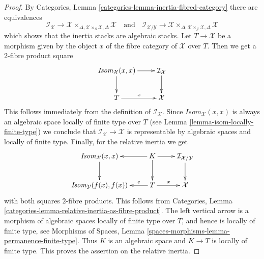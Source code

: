 \documentclass[10pt,a4paper]{amsart}
\theoremstyle{plain}
\theoremstyle{definition}
\theoremstyle{remark}
\numberwithin{equation}{subsection}
\begin{document}
\begin{proof}
By
Categories, Lemma \ref{categories-lemma-inertia-fibred-category}
there are equivalences
$$
\mathcal{I}_\mathcal{X} \to
\mathcal{X} \times_{\Delta, \mathcal{X} \times_S \mathcal{X}, \Delta}
\mathcal{X}
\quad\text{and}\quad
\mathcal{I}_{\mathcal{X}/\mathcal{Y}} \to
\mathcal{X}
\times_{\Delta, \mathcal{X} \times_\mathcal{Y} \mathcal{X}, \Delta}
\mathcal{X}
$$
which shows that the inertia stacks are algebraic stacks.
Let $T \to \mathcal{X}$ be a morphism given by
the object $x$ of the fibre category of $\mathcal{X}$ over $T$.
Then we get a $2$-fibre product square
$$
\xymatrix{
\mathit{Isom}_\mathcal{X}(x, x) \ar[d] \ar[r] &
\mathcal{I}_\mathcal{X} \ar[d] \\
T \ar[r]^x & \mathcal{X}
}
$$
This follows immediately from the definition of $\mathcal{I}_\mathcal{X}$.
Since $\mathit{Isom}_\mathcal{X}(x, x)$ is always an algebraic space
locally of finite type over $T$ (see
Lemma \ref{lemma-isom-locally-finite-type})
we conclude that $\mathcal{I}_\mathcal{X} \to \mathcal{X}$ is representable
by algebraic spaces and locally of finite type. Finally, for
the relative inertia we get
$$
\vcenter{
\xymatrix{
\mathit{Isom}_\mathcal{X}(x, x) \ar[d] &
K \ar[l] \ar[d] \ar[r] &
\mathcal{I}_{\mathcal{X}/\mathcal{Y}} \ar[d] \\
\mathit{Isom}_\mathcal{Y}(f(x), f(x)) &
T \ar[l]_-e \ar[r]^x & \mathcal{X}
}
}
$$
with both squares $2$-fibre products. This follows from
Categories, Lemma \ref{categories-lemma-relative-inertia-as-fibre-product}.
The left vertical arrow is a morphism of algebraic spaces locally of finite
type over $T$, and hence is locally of finite type, see
Morphisms of Spaces,
Lemma \ref{spaces-morphisms-lemma-permanence-finite-type}.
Thus $K$ is an algebraic space and $K \to T$ is locally of finite type.
This proves the assertion on the relative inertia.
\end{proof}
\end{document}
